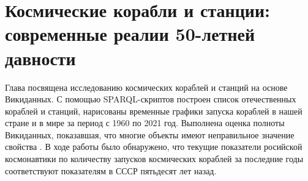 \chapter{Космические корабли и станции: современные реалии 50-летней давности}
\label{ch:spacecraft-space-station}

\begin{marginfigure}[2.0cm]
{
	\setlength{\fboxsep}{0pt}%
	\setlength{\fboxrule}{1pt}%
}
\caption[Союз-19, 2021.]%
{В какой стране спроектирован аппарат, изображённый на рисунке?
См. ответ~\ref{answer:spacecraft_USSR} на с.~\pageref{answer:spacecraft_USSR}.}
\label{question:spacecraft_soyuz19}
\end{marginfigure}

Глава посвящена исследованию космических кораблей и станций на основе Викиданных. 
С помощью SPARQL-скриптов построен список отечественных кораблей и станций, 
нарисованы временные графики запуска кораблей в нашей стране и в мире за период с 1960 по 2021 год. 
Выполнена оценка полноты Викиданных, показавшая, 
что многие объекты имеют неправильное значение свойства 
. В ходе работы было обнаружено, что текущие показатели росийской космонавтики по количеству запусков космических кораблей за последние годы соответствуют показателям в СССР пятьдесят лет назад. 

